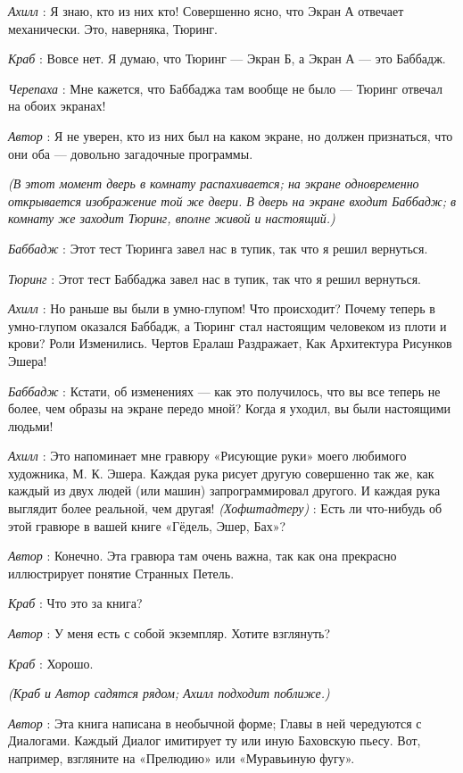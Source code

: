 \documentclass[../main.tex]{subfiles}
\begin{document}
\begin{dialogue}
\emph{Ахилл} : Я знаю, кто из них кто! Совершенно ясно, что Экран А отвечает механически. Это, наверняка, Тюринг.

\emph{Краб} : Вовсе нет. Я думаю, что Тюринг --- Экран Б, а Экран А --- это Баббадж.

\emph{Черепаха} : Мне кажется, что Баббаджа там вообще не было --- Тюринг отвечал на обоих экранах!

\emph{Автор} : Я не уверен, кто из них был на каком экране, но должен признаться, что они оба --- довольно загадочные программы.

\emph{(В этот момент дверь в комнату распахивается; на экране одновременно открывается изображение той же двери. В дверь на экране входит Баббадж; в комнату же заходит Тюринг, вполне живой и настоящий.)}

\emph{Баббадж} : Этот тест Тюринга завел нас в тупик, так что я решил вернуться.

\emph{Тюринг} : Этот тест Баббаджа завел нас в тупик, так что я решил вернуться.

\emph{Ахилл} : Но раньше вы были в умно-глупом! Что происходит? Почему теперь в умно-глупом оказался Баббадж, а Тюринг стал настоящим человеком из плоти и крови? Роли Изменились. Чертов Ералаш Раздражает, Как Архитектура Рисунков Эшера!

\emph{Баббадж} : Кстати, об изменениях --- как это получилось, что вы все теперь не более, чем образы на экране передо мной? Когда я уходил, вы были настоящими людьми!

\emph{Ахилл} : Это напоминает мне гравюру «Рисующие руки» моего любимого художника, М. К. Эшера. Каждая рука рисует другую совершенно так же, как каждый из двух людей (или машин) запрограммировал другого. И каждая рука выглядит более реальной, чем другая! \emph{(Хофштадтеру)} : Есть ли что-нибудь об этой гравюре в вашей книге «Гёдель, Эшер, Бах»?

\emph{Автор} : Конечно. Эта гравюра там очень важна, так как она прекрасно иллюстрирует понятие Странных Петель.

\emph{Краб} : Что это за книга?

\emph{Автор} : У меня есть с собой экземпляр. Хотите взглянуть?

\emph{Краб} : Хорошо.

\emph{(Краб и Автор садятся рядом; Ахилл подходит поближе.)}

\emph{Автор} : Эта книга написана в необычной форме; Главы в ней чередуются с Диалогами. Каждый Диалог имитирует ту или иную Баховскую пьесу. Вот, например, взгляните на «Прелюдию» или «Муравьиную фугу».


\end{dialogue}
\end{document}

